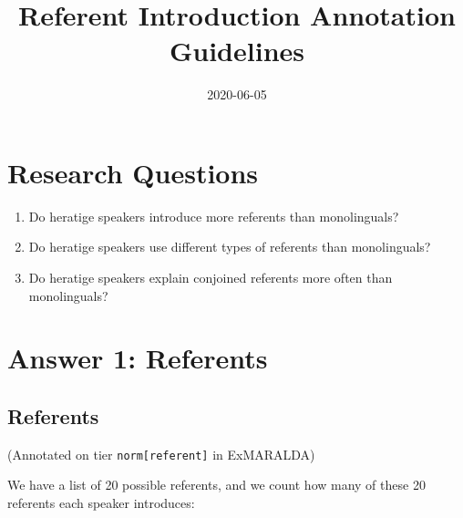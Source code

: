 \documentclass[
]{book}
\title{Referent Introduction Annotation Guidelines}
\author{}
\date{\vspace{-2.5em}2020-06-05}
\begin{document}
\maketitle

{
\setcounter{tocdepth}{1}
\tableofcontents
}
\hypertarget{research-questions}{%
\chapter{Research Questions}\label{research-questions}}

\begin{enumerate}
\def\labelenumi{\arabic{enumi}.}
\item
  Do heratige speakers introduce more referents than monolinguals?
\item
  Do heratige speakers use different types of referents than monolinguals?
\item
  Do heratige speakers explain conjoined referents more often than monolinguals?
\end{enumerate}

\hypertarget{answer-1-referents}{%
\chapter{Answer 1: Referents}\label{answer-1-referents}}

\hypertarget{referents}{%
\section{Referents}\label{referents}}

(Annotated on tier \texttt{norm{[}referent{]}} in ExMARALDA)

We have a list of 20 possible referents, and we count how many of these 20 referents each speaker introduces:
\end{document}
